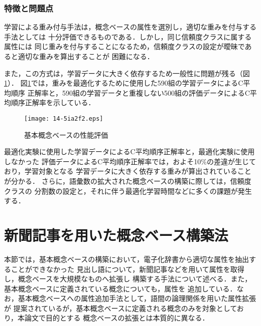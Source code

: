 \documentclass[japanese]{jnlp_1.3e}
\begin{document}
\begin{table}[b]

\end{table}



\subsubsection{特徴と問題点} \label{special}

学習による重み付与手法は，概念ベースの属性を選別し，適切な重みを付与する手法としては
十分評価できるものである．しかし，同じ信頼度クラスに属する属性には
同じ重みを付与することになるため，信頼度クラスの設定が曖昧であると適切な重みを算出することが
困難になる．

また，この方式は，学習データに大きく依存するため一般性に問題が残る（図\ref{fig:270-590}）．
図\ref{fig:270-590}では，重みを最適化するために使用した590組の学習データによるC平均順序
正解率と，590組の学習データと重複しない500組の評価データによるC平均順序正解率を示している．
\begin{figure}[t]
	\begin{center}
	\texttt{[image: 14-5ia2f2.eps]}
		\caption{基本概念ベースの性能評価}
		\label{fig:270-590}
	\end{center}
\end{figure}

最適化実験に使用した学習データによるC平均順序正解率と，最適化実験に使用しなかった
評価データによるC平均順序正解率では，およそ10\%の差違が生じており，学習対象となる
学習データに大きく依存する重みが算出されていることが分かる．
さらに，語彙数の拡大された概念ベースの構築に際しては，信頼度クラスの
分割数の設定と，それに伴う最適化学習時間などに多くの課題が発生する．



\section{新聞記事を用いた概念ベース構築法}

本節では，基本概念ベースの構築において，電子化辞書から適切な属性を抽出することができなかった
見出し語について，新聞記事などを用いて属性を取得し，概念ベースを大規模なものへ拡張し
構築する手法について述べる．また，基本概念ベースに定義されている概念についても，属性を
追加している．なお，基本概念ベースへの属性追加手法として，語間の論理関係を用いた属性拡張\cite{kojima2004a}が
提案されているが，基本概念ベースに定義される概念のみを対象としており，本論文で目的とする
概念ベースの拡張とは本質的に異なる．
\end{document}
